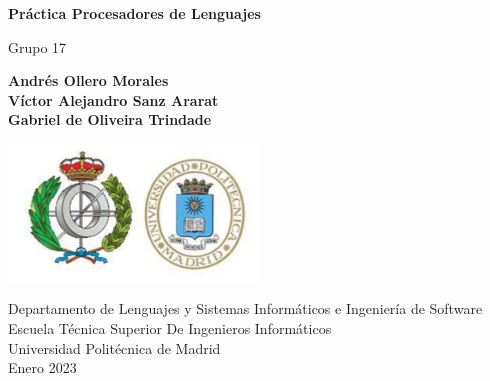 \begin{titlepage}
   \begin{center}
       \vspace*{1cm}

       \textbf{Práctica Procesadores de Lenguajes}

       \vspace{0.5cm}
        Grupo 17
            
       \vspace{1.5cm}

        \textbf{Andrés Ollero Morales}\\
        \textbf{Víctor Alejandro Sanz Ararat}\\
        \textbf{Gabriel de Oliveira Trindade}\\

       \vfill
            
       \vspace{0.5cm}
     
       \includegraphics[width=0.5\textwidth]{fiupm.png}

        \vfill
            
       \vspace{0.1cm}
       Departamento de Lenguajes y Sistemas Informáticos e Ingeniería de Software\\
       Escuela Técnica Superior De Ingenieros Informáticos\\
       Universidad Politécnica de Madrid\\
       Enero 2023
            
   \end{center}
\end{titlepage}